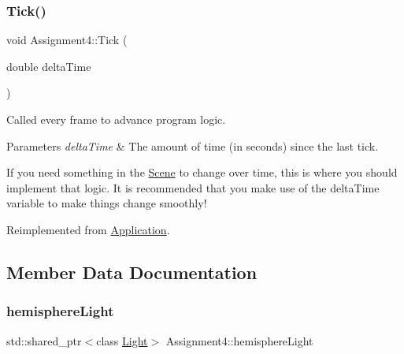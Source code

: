 \hypertarget{class_assignment4_a3ef3fef7a6ae13603bc453b29e079c5d}{}\label{class_assignment4_a3ef3fef7a6ae13603bc453b29e079c5d} 
\subsubsection{\texorpdfstring{Tick()}{Tick()}}
{\footnotesize\ttfamily void Assignment4\+::\+Tick (\begin{DoxyParamCaption}\item[{double}]{delta\+Time }\end{DoxyParamCaption})\hspace{0.3cm}{\ttfamily [virtual]}}



Called every frame to advance program logic. 


\begin{DoxyParams}{Parameters}
{\em delta\+Time} & The amount of time (in seconds) since the last tick.\\
\hline
\end{DoxyParams}
If you need something in the \hyperlink{class_scene}{Scene} to change over time, this is where you should implement that logic. It is recommended that you make use of the delta\+Time variable to make things change smoothly! 

Reimplemented from \hyperlink{class_application_a0800afd5651153d31fa775a8048d14dd}{Application}.



\subsection{Member Data Documentation}
\hypertarget{class_assignment4_a2ea813219380cc65ef89749586f5d4b5}{}\label{class_assignment4_a2ea813219380cc65ef89749586f5d4b5} 
\subsubsection{\texorpdfstring{hemisphere\+Light}{hemisphereLight}}
{\footnotesize\ttfamily std\+::shared\+\_\+ptr$<$class \hyperlink{class_light}{Light}$>$ Assignment4\+::hemisphere\+Light\hspace{0.3cm}{\ttfamily [private]}}

\hypertarget{class_assignment4_a327ee7158090e2a2db8763df3cb8608d}{}\label{class_assignment4_a327ee7158090e2a2db8763df3cb8608d} 
